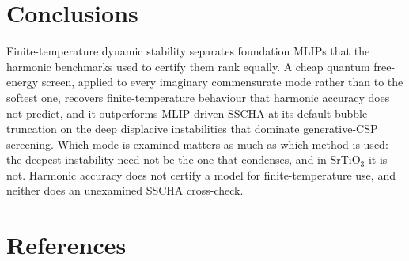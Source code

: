 \documentclass{article}
\begin{document}
\section{Conclusions}
\label{sec:conclusions}

Finite-temperature dynamic stability separates foundation MLIPs that the harmonic benchmarks used to certify them rank equally. A cheap quantum free-energy screen, applied to every imaginary commensurate mode rather than to the softest one, recovers finite-temperature behaviour that harmonic accuracy does not predict, and it outperforms MLIP-driven SSCHA at its default bubble truncation on the deep displacive instabilities that dominate generative-CSP screening. Which mode is examined matters as much as which method is used: the deepest instability need not be the one that condenses, and in SrTiO$_3$ it is not. Harmonic accuracy does not certify a model for finite-temperature use, and neither does an unexamined SSCHA cross-check.

\begin{ack}
\end{ack}

\section*{References}
\end{document}
